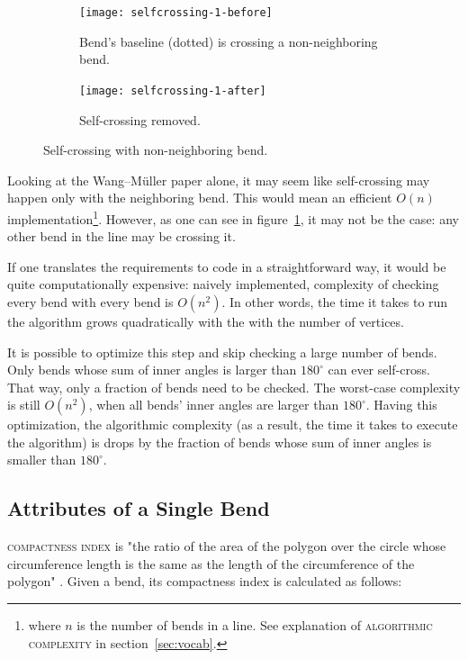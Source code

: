 \documentclass[a4paper]{article}
\newcommand{\WM}{Wang--M{\"u}ller}
\begin{document}
\begin{figure}[ht]
    \centering
    \begin{subfigure}[b]{.49\textwidth}
        \texttt{[image: selfcrossing-1-before]}
        \caption{Bend's baseline (dotted) is crossing a non-neighboring bend.}
    \end{subfigure}
    \hfill
    \begin{subfigure}[b]{.49\textwidth}
        \texttt{[image: selfcrossing-1-after]}
        \caption{Self-crossing removed.}
    \end{subfigure}
    \caption{Self-crossing with non-neighboring bend.}
    \label{fig:selfcrossing-1-non-neighbor}
\end{figure}

Looking at the {\WM} paper alone, it may seem like self-crossing may happen
only with the neighboring bend. This would mean an efficient $O(n)$
implementation\footnote{where $n$ is the number of bends in a line. See
explanation of \textsc{algorithmic complexity} in section~\ref{sec:vocab}.}.
However, as one can see in figure~\ref{fig:selfcrossing-1-non-neighbor}, it may
not be the case: any other bend in the line may be crossing it.

If one translates the requirements to code in a straightforward way, it would
be quite computationally expensive: naively implemented, complexity of checking
every bend with every bend is $O(n^2)$. In other words, the time it takes to
run the algorithm grows quadratically with the with the number of vertices.

It is possible to optimize this step and skip checking a large number of bends.
Only bends whose sum of inner angles is larger than $180^\circ$ can ever
self-cross. That way, only a fraction of bends need to be checked. The
worst-case complexity is still $O(n^2)$, when all bends' inner angles are
larger than $180^\circ$. Having this optimization, the algorithmic complexity
(as a result, the time it takes to execute the algorithm) is drops by the
fraction of bends whose sum of inner angles is smaller than $180^\circ$.

\subsection{Attributes of a Single Bend}

\textsc{compactness index} is "the ratio of the area of the polygon over the
circle whose circumference length is the same as the length of the
circumference of the polygon" \cite{wang1998line}. Given a bend, its
compactness index is calculated as follows:
\end{document}
